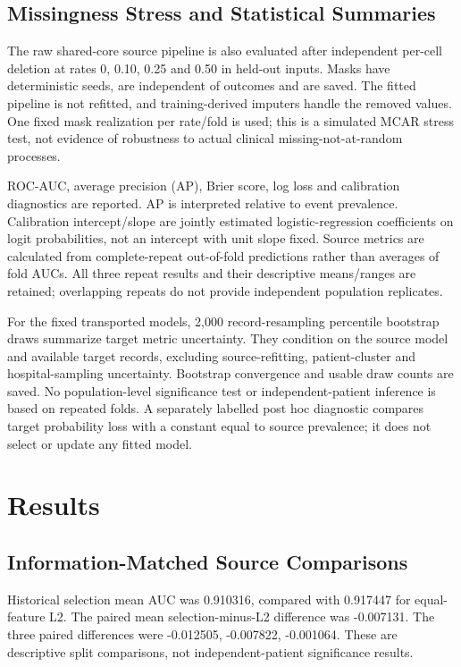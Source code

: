 \documentclass[conference]{IEEEtran}
\begin{document}
\subsection{Missingness Stress and Statistical Summaries}
The raw shared-core source pipeline is also evaluated after independent per-cell deletion at rates 0, 0.10, 0.25 and 0.50 in held-out inputs. Masks have deterministic seeds, are independent of outcomes and are saved. The fitted pipeline is not refitted, and training-derived imputers handle the removed values. One fixed mask realization per rate/fold is used; this is a simulated MCAR stress test, not evidence of robustness to actual clinical missing-not-at-random processes.

ROC-AUC, average precision (AP), Brier score, log loss and calibration diagnostics are reported. AP is interpreted relative to event prevalence. Calibration intercept/slope are jointly estimated logistic-regression coefficients on logit probabilities, not an intercept with unit slope fixed. Source metrics are calculated from complete-repeat out-of-fold predictions rather than averages of fold AUCs. All three repeat results and their descriptive means/ranges are retained; overlapping repeats do not provide independent population replicates.

For the fixed transported models, 2,000 record-resampling percentile bootstrap draws summarize target metric uncertainty. They condition on the source model and available target records, excluding source-refitting, patient-cluster and hospital-sampling uncertainty. Bootstrap convergence and usable draw counts are saved. No population-level significance test or independent-patient inference is based on repeated folds. A separately labelled post hoc diagnostic compares target probability loss with a constant equal to source prevalence; it does not select or update any fitted model.

\section{Results}
\subsection{Information-Matched Source Comparisons}
Historical selection mean AUC was 0.910316, compared with 0.917447 for equal-feature L2. The paired mean selection-minus-L2 difference was -0.007131. The three paired differences were -0.012505, -0.007822, -0.001064. These are descriptive split comparisons, not independent-patient significance results.
\end{document}
